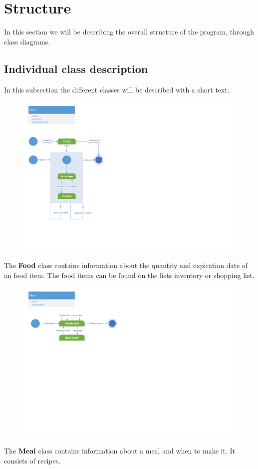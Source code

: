 \section{Structure}
In this section we will be describing the overall structure of the program, through class diagrams.

\subsection{Individual class description}
In this subsection the different classes will be described with a short text.

\begin{figure}[H]
	\centering
	\includegraphics[width=1.0\textwidth]{Development/ProblemDomain/FoodClass.pdf}
	\label{FoodClass}
\end{figure}
The \textbf{Food} class contains information about the quantity and expiration date of an food item. The food items can be found on the lists inventory or shopping list.

\begin{figure}[H]
	\centering
	\includegraphics[width=1.0\textwidth]{Development/ProblemDomain/MealClass.pdf}
	\label{MealClass}
\end{figure}
The \textbf{Meal} class contains information about a meal and when to make it. It consists of recipes.

